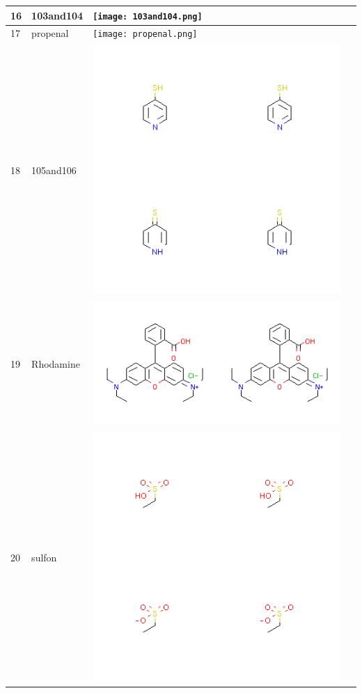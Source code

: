 \begin{longtable}{|l|l|l|l|}
\hline
16 & 103and104 & \texttt{[image: 103and104.png]} & \\
\hline
17 & propenal & \texttt{[image: propenal.png]} & \\
\hline
18 & 105and106 & \includegraphics[scale=0.6]{105and106.png} & \\
\hline
19 & Rhodamine & \includegraphics[scale=0.6]{Rhodamine.png} & \\
\hline
20 & sulfon & \includegraphics[scale=0.6]{sulfon.png} & \\

\end{longtable}
